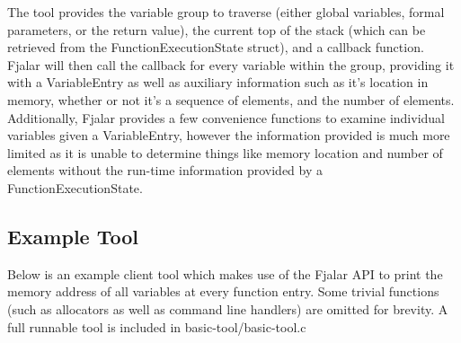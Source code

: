\documentclass{article}
\begin{document}
The tool provides the variable group to traverse (either global
variables, formal parameters, or the return value), the current top of
the stack (which can be retrieved from the FunctionExecutionState
struct),  and a callback function. Fjalar will then call the callback for every variable within
the group, providing it with a VariableEntry as well as auxiliary
information such as it's location in memory, whether or not it's a
sequence of elements, and the number of elements. Additionally,
Fjalar provides a few convenience functions to examine individual
variables given a VariableEntry, however the information provided is
much more limited as it is unable to determine things like memory
location and number of elements without the run-time information
provided by a FunctionExecutionState.

\subsection{Example Tool}

Below is an example client tool which makes use of the Fjalar API to print
the memory address of all variables at every function entry. Some
trivial functions (such as allocators as well as command line
handlers) are omitted for brevity. A full runnable tool is included in
basic-tool/basic-tool.c 
\end{document}
